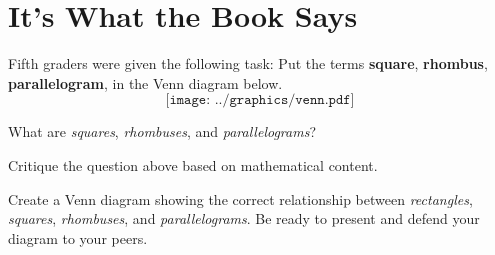 \newpage
\section{It's What the Book Says} 
                                  

Fifth graders were given the following task: Put the
terms \textbf{square}, \textbf{rhombus}, \textbf{parallelogram}, in
the Venn diagram below.
\[
\texttt{[image: ../graphics/venn.pdf]}
\]


\begin{prob} 
What are \textit{squares}, \textit{rhombuses},
and \textit{parallelograms}?
\end{prob}


\begin{prob} 
Critique the question above based on mathematical content.
\end{prob}

\begin{prob} 
Create a Venn diagram showing the correct relationship
between \textit{rectangles}, \textit{squares}, \textit{rhombuses},
and \textit{parallelograms}. Be ready to present and defend your
diagram to your peers.
\end{prob}
